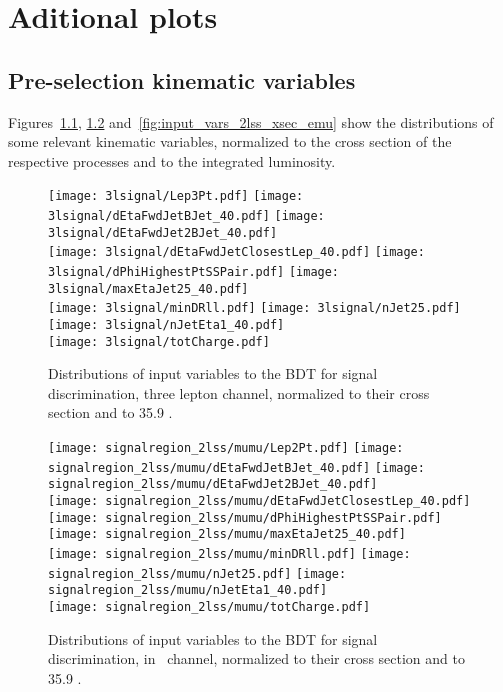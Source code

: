 \chapter{Aditional plots}

\section{Pre-selection kinematic variables} \label{app:presel_plots}

Figures~\ref{fig:input_vars_3l_xsec}, \ref{fig:input_vars_2lss_xsec_mumu} and~\ref{fig:input_vars_2lss_xsec_emu} show the distributions of some relevant kinematic variables, normalized to the cross section of the respective processes and to the integrated luminosity.
\newpage
\begin{figure} [!h]
  \centering
  \texttt{[image: 3lsignal/Lep3Pt.pdf]}
  \texttt{[image: 3lsignal/dEtaFwdJetBJet\_40.pdf]}
  \texttt{[image: 3lsignal/dEtaFwdJet2BJet\_40.pdf]}\\
  \texttt{[image: 3lsignal/dEtaFwdJetClosestLep\_40.pdf]} 
  \texttt{[image: 3lsignal/dPhiHighestPtSSPair.pdf]}
  \texttt{[image: 3lsignal/maxEtaJet25\_40.pdf]}\\
  \texttt{[image: 3lsignal/minDRll.pdf]}
  \texttt{[image: 3lsignal/nJet25.pdf]} 
  \texttt{[image: 3lsignal/nJetEta1\_40.pdf]}\\
  \texttt{[image: 3lsignal/totCharge.pdf]}
  \caption[Input variables to the BDT, $3l$ channel.]{Distributions of input variables to the BDT for signal discrimination, three lepton channel, normalized to their cross section and to 35.9 \fbinv.}
  \label{fig:input_vars_3l_xsec}
\end{figure}

\begin{figure} [!h]
  \centering
  \texttt{[image: signalregion\_2lss/mumu/Lep2Pt.pdf]}
  \texttt{[image: signalregion\_2lss/mumu/dEtaFwdJetBJet\_40.pdf]}
  \texttt{[image: signalregion\_2lss/mumu/dEtaFwdJet2BJet\_40.pdf]}\\
  \texttt{[image: signalregion\_2lss/mumu/dEtaFwdJetClosestLep\_40.pdf]}
  \texttt{[image: signalregion\_2lss/mumu/dPhiHighestPtSSPair.pdf]}
  \texttt{[image: signalregion\_2lss/mumu/maxEtaJet25\_40.pdf]}\\
  \texttt{[image: signalregion\_2lss/mumu/minDRll.pdf]}
  \texttt{[image: signalregion\_2lss/mumu/nJet25.pdf]} 
  \texttt{[image: signalregion\_2lss/mumu/nJetEta1\_40.pdf]}\\
  \texttt{[image: signalregion\_2lss/mumu/totCharge.pdf]}
  \caption[Input variables to the BDT, $2lss - \mumu$ channel]{Distributions of input variables to the BDT for signal discrimination, in \mumu\ channel, normalized to their cross section and to 35.9 \fbinv.}
  \label{fig:input_vars_2lss_xsec_mumu}
\end{figure}

